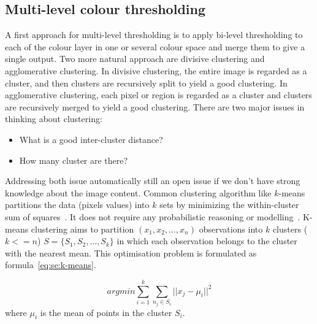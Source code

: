 
\subsection*{Multi-level colour thresholding} %
\label{sub:ap:muli_threshold}

A first approach for multi-level thresholding is to apply bi-level thresholding to each of the colour layer in one or several colour space and merge them to give a single output.
Two more natural approach are divisive clustering and agglomerative clustering.
In divisive clustering, the entire image is regarded as a cluster, and then clusters are recursively split to yield a good clustering.
In agglomerative clustering, each pixel or region is regarded as a cluster and clusters are recursively merged to yield a good clustering.
There are two major issues in thinking about clustering:
\begin{itemize}
	\item What is a good inter-cluster distance?
	\item How many cluster are there?
\end{itemize}
Addressing both issue automatically still an open issue if we don't have strong knowledge about the image content.
Common clustering algorithm like $k$-means partitions the data (pixels values) into $k$ sets by minimizing the within-cluster sum of squares~\cite{PonceForsyth2012}.
It does not require any probabilistic reasoning or modelling~\cite{Bishop2006PRM}.
K-means clustering aims to partition $(x_1, x_2, ...,x_n)$ observations into $k$ clusters ($k <= n$) $S=\{S_1, S_2, ..., S_k\}$ in which each observation belongs to the cluster with the nearest mean.
This optimisation problem is formulated as formula~\ref{eq:se:k-means}.

\begin{equation}
	arg min \sum\limits_{i=1}^k \sum\limits_{n_j \in S_i} ||x_j - \mu_i||^2
	\label{eq:se:k-means}
\end{equation}
where $\mu_i$ is the mean of points in the cluster $S_i$.













